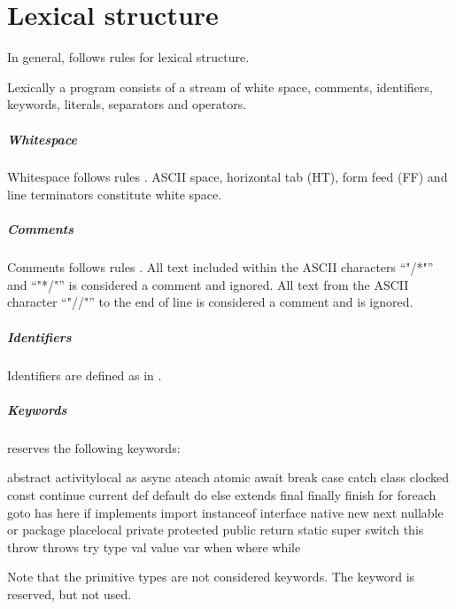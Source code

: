 \chapter{Lexical structure}

In general, \Xten{} follows \java{} rules \cite[Chapter 3]{jls2} for
lexical structure.

Lexically a program consists of a stream of white space, comments,
identifiers, keywords, literals, separators and operators.

\paragraph{Whitespace}
Whitespace  follows \java{} rules
\cite[Chapter 3.6]{jls2}. ASCII space, horizontal tab (HT), form feed (FF) and line terminators constitute white space.


\paragraph{Comments}
Comments  follows \java{} rules
\cite[Chapter 3.7]{jls2}. 
All text included within the ASCII characters ``\xcd"/*"'' and
``\xcd"*/"'' is
considered a comment and ignored. All text from the ASCII character
``\xcd"//"'' to the end of line is considered a comment and is ignored.

\paragraph{Identifiers}
Identifiers  are defined as in \java.

\paragraph{Keywords}
\Xten{} reserves the following keywords:
\begin{xten}
abstract        activitylocal   as              async
ateach          atomic          await           break
case            catch           class           clocked
const           continue        current         def
default         do              else            extends
final           finally         finish          for
foreach         goto            has             here
if              implements      import          instanceof
interface       native          new             next
nullable        or              package         placelocal
private         protected       public          return
static          super           switch          this
throw           throws          try             type
val             value           var             when
where           while
\end{xten}
Note that the primitive types are not considered keywords.
The keyword  is reserved, but not used.

